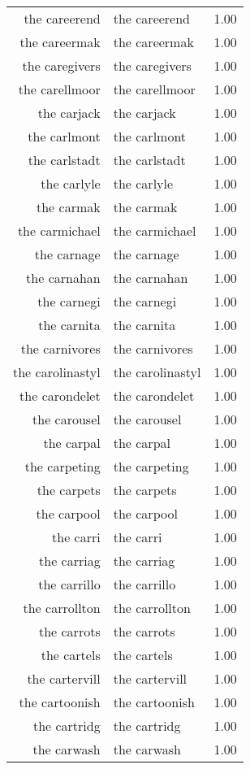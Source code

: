 \begin{table}[ht]
\begin{tabular}{rlr}
  the careerend & the careerend & 1.00 \\ 
  the careermak & the careermak & 1.00 \\ 
  the caregivers & the caregivers & 1.00 \\ 
  the carellmoor & the carellmoor & 1.00 \\ 
  the carjack & the carjack & 1.00 \\ 
  the carlmont & the carlmont & 1.00 \\ 
  the carlstadt & the carlstadt & 1.00 \\ 
  the carlyle & the carlyle & 1.00 \\ 
  the carmak & the carmak & 1.00 \\ 
  the carmichael & the carmichael & 1.00 \\ 
  the carnage & the carnage & 1.00 \\ 
  the carnahan & the carnahan & 1.00 \\ 
  the carnegi & the carnegi & 1.00 \\ 
  the carnita & the carnita & 1.00 \\ 
  the carnivores & the carnivores & 1.00 \\ 
  the carolinastyl & the carolinastyl & 1.00 \\ 
  the carondelet & the carondelet & 1.00 \\ 
  the carousel & the carousel & 1.00 \\ 
  the carpal & the carpal & 1.00 \\ 
  the carpeting & the carpeting & 1.00 \\ 
  the carpets & the carpets & 1.00 \\ 
  the carpool & the carpool & 1.00 \\ 
  the carri & the carri & 1.00 \\ 
  the carriag & the carriag & 1.00 \\ 
  the carrillo & the carrillo & 1.00 \\ 
  the carrollton & the carrollton & 1.00 \\ 
  the carrots & the carrots & 1.00 \\ 
  the cartels & the cartels & 1.00 \\ 
  the cartervill & the cartervill & 1.00 \\ 
  the cartoonish & the cartoonish & 1.00 \\ 
  the cartridg & the cartridg & 1.00 \\ 
  the carwash & the carwash & 1.00 \\ 

\end{tabular}
\end{table}
